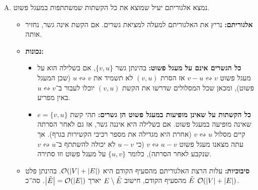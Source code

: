 \documentclass[]{../../../../tex/classes/homework}
\newcommand\squigd{\leftrightsquigarrow}
\begin{document}
\begin{enumerate}[(A)]
\begin{itemize}
		\end{itemize}
		\item נמצא אלגוריתם יעיל שמוצא את כל הקשתות שמשתתפות במעגל פשוט. 
		\begin{itemize}
			\item \textbf{אלגוריתם: }נריץ את האלגוריתם למעלה למציאת גשרים. אם הקשת אינה גשר, נחזיר אותה. 
			\item \textbf{נכונות: }
			\begin{itemize}
				\item \textbf{כל הגשרים אינם על מעגל פשוט: }בהינתן גשר $\{v, u\}$, אם בשלילה הוא על מעגל פשוט $v - u \squigd v$ אז הסרת $(v, u)$ לא תשמיד את $u \squigd v$ (שכן המעגל פשוט), ומכאן שכל המסלולים שדרשו את הקשת $(v, u)$ יוכלו לעבור ב־$u \squigd v$ באין מפריע. 
				\item \textbf{כל הקשתות על שאינן מופיעות במעגל פשוט הן גשרים: }תהי קשת $e = \{v, u\}$ שאינה מופיעה במעגל פשוט. אם בשלילה היא איננה גשר, אז גם לאחר הסרתה קיים מסלול $v \squigd u$ (אחרת היא מגדילה את מספר רכיבי הקשירות בגרף). אך עתה מצאנו מעגל פשוט $v \squigd u - v$ (כי $u - v$ לא יכולה להשתתף ב־$v \squigd u$ שנקבע לאחר הסרתה), כלומר $\{u, v\}$ על מעגל פשוט וזו סתירה. 
			\end{itemize}
			\item \textbf{סיבוכיות: }עלות הרצת האלגוריתם מהסעיף הקודם היא $\mathcal{O}(\left \lvert V \right \rvert + \left \lvert E \right \rvert)$. בהינתן פלט $\tilde E$ מהסעיף הקודם, חישוב $E \setminus \tilde E$ יארך $\left \lvert \tilde E \right \rvert = \mathcal{O}(\left \lvert E \right \rvert)$. סה''כ $\mathcal{O}(\left \lvert V \right \rvert + \left \lvert E \right \rvert)$. 
		\end{itemize}
	\end{enumerate}
	
	\npage
\end{document}
